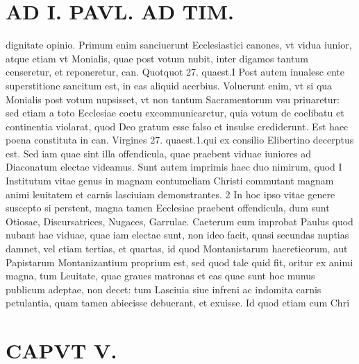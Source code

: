 \documentclass{article}
\begin{document}
\begin{pages}
\section*{AD I. PAVL. AD TIM. }
\marginpar{[ p.262 ]}\pstart dignitate opinio. Primum enim sanciuerunt Ecclesiastici canones, vt vidua iunior, atque etiam vt Monialis, quae post votum nubit, inter digamos tantum censeretur, et reponeretur, can. Quotquot 27. quaest.I Post autem inualesc ente superstitione sancitum est, in eas aliquid acerbius. Voluerunt enim, vt si qua Monialis post votum nupsisset, vt non tantum Sacramentorum vsu priuaretur: sed etiam a toto Ecclesiae coetu excommunicaretur, quia votum de coelibatu et continentia violarat, quod Deo gratum esse falso et insulse crediderunt. Est haec poena constituta in can. Virgines 27. quaest.1.qui ex consilio Elibertino decerptus est. Sed iam quae sint illa offendicula, quae praebent viduae iuniores ad Diaconatum electae videamus. Sunt autem imprimis haec duo nimirum, quod I Institutum vitae genus in magnam contumeliam Christi commutant magnam animi leuitatem et carnis lasciuiam demonstrantes. 2 In hoc ipso vitae genere suscepto si perstent, magna tamen Ecclesiae praebent offendicula, dum sunt Otiosae, Discursatrices, Nugaces, Garrulae. Caeterum cum improbat Paulus quod nubant hae viduae, quae iam electae sunt, non ideo facit, quasi secundas nuptias damnet, vel etiam tertias, et quartas, id quod Montanistarum haereticorum, aut Papistarum Montanizantium proprium est, sed quod tale quid fit, oritur ex animi magna, tum Leuitate, quae graues matronas et eas quae sunt hoc munus publicum adeptae, non decet: tum Lasciuia siue infreni ac indomita carnis petulantia, quam tamen abiecisse debuerant, et exuisse. Id quod etiam cum Chri\pend
\section*{CAPVT V. }
\marginpar{[ p.283 ]}\pstart {}
{}

\end{pages}
\end{document}
